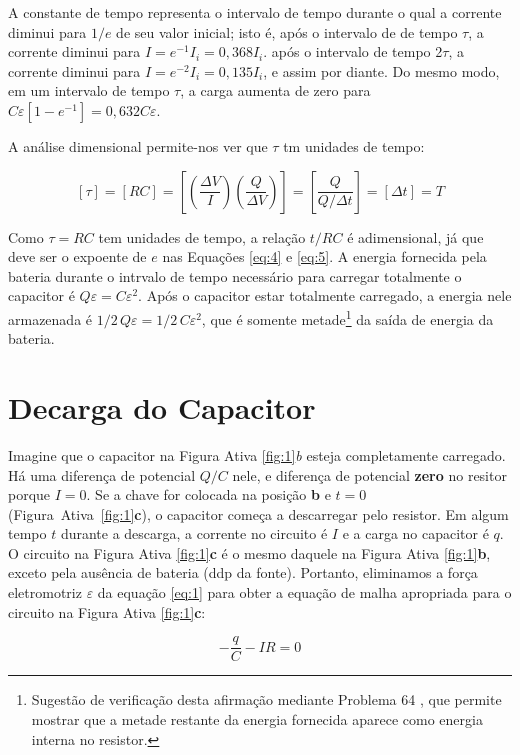 \documentclass[a4paper,12pt]{article}
\begin{document}
A constante de tempo representa o intervalo de tempo durante o qual a corrente diminui para $1/e$ de seu valor inicial; isto é, após o intervalo de de tempo $\tau$, a corrente diminui para $I=e^{-1}I_i = 0,368I_i$. após o intervalo de tempo 2$\tau$, a corrente diminui para \hbox{$I=e^{-2}I_i = 0,135I_i$,} e assim por diante. Do mesmo modo, em um intervalo de tempo $\tau$, a carga aumenta de zero para \hbox{$C\varepsilon[1-e^{-1}] = 0,632C\varepsilon$.}

A análise dimensional permite-nos ver que $\tau$ tm unidades de tempo:

$$
[\tau]=[RC]=\left[ \left( \frac{\Delta V}{I} \right) \left( \frac{Q}{\Delta V} \right) \right] = \left[ \frac{Q}{Q/\Delta t} \right] = [\Delta t] = T
$$

Como $\tau=RC$ tem unidades de tempo, a relação $t/RC$ é adimensional, já que deve ser o expoente de $e$ nas Equações \ref{eq:4} e \ref{eq:5}. A energia fornecida pela bateria durante o intrvalo de tempo necessário para carregar totalmente o capacitor é \hbox{$Q\varepsilon=C\varepsilon^2$.} Após o capacitor estar totalmente carregado, a energia nele armazenada é \hbox{$1/2 \, Q\varepsilon = 1/2\,C\varepsilon^2$,} que é somente metade\footnote{Sugestão de verificação desta afirmação mediante Problema 64 \cite{jeewett11}, que permite mostrar que a metade restante da energia fornecida aparece como energia interna no resistor.} da saída de energia da bateria.

\section*{Decarga do Capacitor}
 
Imagine que o capacitor na Figura Ativa \ref{fig:1}\textit{b} esteja completamente carregado. Há uma diferença de potencial $Q/C$ nele, e diferença de potencial \textbf{zero} no resitor porque $I=0$. Se a chave for colocada na posição \textbf{b} e $t=0$ \hbox{(Figura Ativa \ref{fig:1}\textbf{c}),} o capacitor começa a descarregar pelo resistor. Em algum tempo $t$ durante a descarga, a corrente no circuito é $I$ e a carga no capacitor é $q$. O circuito na Figura Ativa \hbox{\ref{fig:1}\textbf{c}} é o mesmo daquele na Figura Ativa \hbox{\ref{fig:1}\textbf{b},} exceto pela ausência de bateria (ddp da fonte). Portanto, eliminamos a força eletromotriz $\varepsilon$ da equação \ref{eq:1} para obter a equação de malha apropriada para o circuito na Figura Ativa \hbox{\ref{fig:1}\textbf{c}:}


\begin{equation} \label{eq:7}
- \frac{q}{C}-IR=0    
\end{equation}
\end{document}

